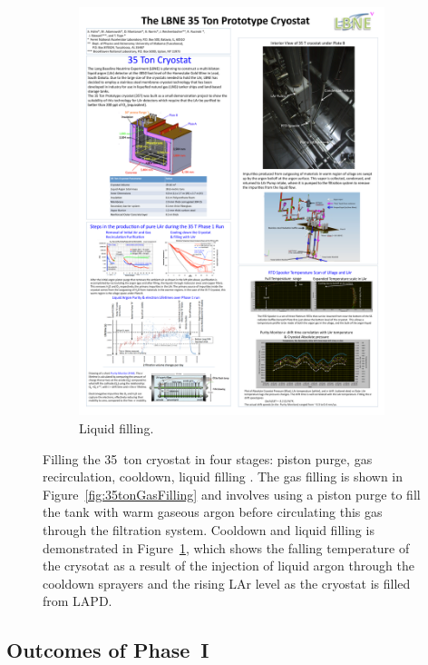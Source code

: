 \begin{figure}
\begin{subfigure}[t]{0.48\linewidth}
    \includegraphics[width=0.98\textwidth]{35tonLiquidFilling.pdf}
    \caption{Liquid filling.}
    \label{fig:35tonLiquidFilling}
  \end{subfigure}
  \caption[Filling the 35~ton cryostat in four stages: piston purge, gas recirculation, cooldown and liquid filling.]{Filling the 35~ton cryostat in four stages: piston purge, gas recirculation, cooldown, liquid filling \cite{35tonPhaseI2015}.  The gas filling is shown in Figure~\ref{fig:35tonGasFilling} and involves using a piston purge to fill the tank with warm gaseous argon before circulating this gas through the filtration system.  Cooldown and liquid filling is demonstrated in Figure~\ref{fig:35tonLiquidFilling}, which shows the falling temperature of the crysotat as a result of the injection of liquid argon through the cooldown sprayers and the rising LAr level as the cryostat is filled from LAPD.}
  \label{fig:35tonFilling}
\end{figure}

\subsection{Outcomes of Phase~I}\label{sec:35tonPhaseIOutcomes}


